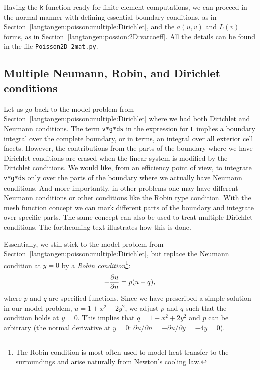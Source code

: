 Having the {\fontsize{10pt}{10pt}\texttt{k}} function ready for finite element computations, we
can proceed in the normal manner with defining essential boundary
conditions, as in Section~\ref{langtangen:poisson:multiple:Dirichlet},
and the $a(u,v)$ and $L(v)$ forms, as in
Section~\ref{langtangen:possion:2D:varcoeff}.
All the details can be found in the file {\fontsize{10pt}{10pt}\verb!Poisson2D_2mat.py!}.


\subsection{Multiple Neumann, Robin, and Dirichlet conditions}
\label{langtangen:poisson:mat:neumann}

Let us go back to the model problem from 
Section~\ref{langtangen:poisson:multiple:Dirichlet} 
where we had both Dirichlet and Neumann conditions.
The term {\fontsize{10pt}{10pt}\texttt{v*g*ds}} in the expression for {\fontsize{10pt}{10pt}\texttt{L}} implies a
boundary integral over the complete boundary, or in \fenics{} terms,
an integral over all exterior cell facets.
However, the contributions from the parts of the boundary where we have
Dirichlet conditions are erased when the linear system is modified by
the Dirichlet conditions.
We would like, from an efficiency point of view, to integrate {\fontsize{10pt}{10pt}\texttt{v*g*ds}}
only over the parts of the boundary where we actually have Neumann conditions.
And more importantly,
in other problems one may have different Neumann conditions or
other conditions like the Robin type condition. 
With the mesh function concept we can mark
different parts of the boundary and integrate over specific parts.
The same concept can also be used to treat multiple Dirichlet conditions.
The forthcoming text illustrates how this is done.

Essentially, we still stick to the model problem from
Section~\ref{langtangen:poisson:multiple:Dirichlet}, but replace the
Neumann condition at $y=0$ by a \emph{Robin condition}\footnote{The Robin condition is
most often used to model heat transfer to the surroundings and arise
naturally from Newton's cooling law.}:
\[ -{\partial u\over\partial n} = p(u-q),\]
where $p$ and $q$ are specified functions. 
Since we have prescribed a simple solution in our model problem,
$u=1+x^2+2y^2$, we adjust $p$ and $q$ such that the condition holds
at $y=0$. This implies that $q=1+x^2+2y^2$ and $p$ can be arbitrary 
(the normal derivative at $y=0$: $\partial u/\partial n = -\partial u/\partial y = -4y=0$).

